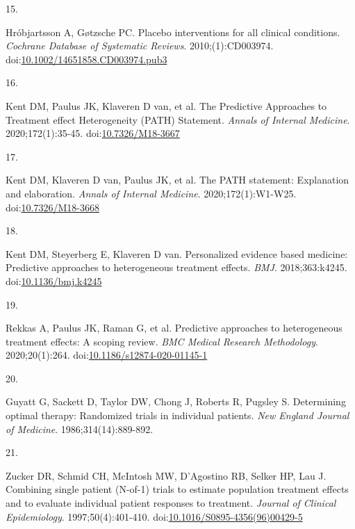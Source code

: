 \documentclass[
  11pt,
]{article}
\newlength{\cslhangindent}
\newlength{\csllabelwidth}
\newenvironment{CSLReferences}[2] %
 {\begin{list}{}{%
  \setlength{\itemindent}{0pt}
  \setlength{\leftmargin}{0pt}
  \setlength{\parsep}{0pt}
  \ifodd #1
   \setlength{\leftmargin}{\cslhangindent}
   \setlength{\itemindent}{-1\cslhangindent}
  \fi
  \setlength{\itemsep}{#2\baselineskip}}}
 {\end{list}}
\newcommand{\CSLLeftMargin}[1]{\parbox[t]{\csllabelwidth}{\strut#1\strut}}
\newcommand{\CSLRightInline}[1]{\parbox[t]{\linewidth - \csllabelwidth}{\strut#1\strut}}
\begin{document}
\begin{CSLReferences}{0}{1}
\CSLLeftMargin{15. }%
\CSLRightInline{Hróbjartsson A, Gøtzsche PC. Placebo interventions for all clinical conditions. \emph{Cochrane Database of Systematic Reviews}. 2010;(1):CD003974. doi:\href{https://doi.org/10.1002/14651858.CD003974.pub3}{10.1002/14651858.CD003974.pub3}}

\CSLLeftMargin{16. }%
\CSLRightInline{{Kent DM, Paulus JK, Klaveren D van, et al.} The {P}redictive {A}pproaches to {T}reatment effect {H}eterogeneity ({PATH}) {S}tatement. \emph{Annals of Internal Medicine}. 2020;172(1):35-45. doi:\href{https://doi.org/10.7326/M18-3667}{10.7326/M18-3667}}

\CSLLeftMargin{17. }%
\CSLRightInline{{Kent DM, Klaveren D van, Paulus JK, et al.} The {PATH} statement: Explanation and elaboration. \emph{Annals of Internal Medicine}. 2020;172(1):W1-W25. doi:\href{https://doi.org/10.7326/M18-3668}{10.7326/M18-3668}}

\CSLLeftMargin{18. }%
\CSLRightInline{Kent DM, Steyerberg E, Klaveren D van. Personalized evidence based medicine: Predictive approaches to heterogeneous treatment effects. \emph{BMJ}. 2018;363:k4245. doi:\href{https://doi.org/10.1136/bmj.k4245}{10.1136/bmj.k4245}}

\CSLLeftMargin{19. }%
\CSLRightInline{{Rekkas A, Paulus JK, Raman G, et al.} Predictive approaches to heterogeneous treatment effects: A scoping review. \emph{BMC Medical Research Methodology}. 2020;20(1):264. doi:\href{https://doi.org/10.1186/s12874-020-01145-1}{10.1186/s12874-020-01145-1}}

\CSLLeftMargin{20. }%
\CSLRightInline{Guyatt G, Sackett D, Taylor DW, Chong J, Roberts R, Pugsley S. Determining optimal therapy: Randomized trials in individual patients. \emph{New England Journal of Medicine}. 1986;314(14):889-892.}

\CSLLeftMargin{21. }%
\CSLRightInline{Zucker DR, Schmid CH, McIntosh MW, D'Agostino RB, Selker HP, Lau J. Combining single patient ({N}-of-1) trials to estimate population treatment effects and to evaluate individual patient responses to treatment. \emph{Journal of Clinical Epidemiology}. 1997;50(4):401-410. doi:\href{https://doi.org/10.1016/S0895-4356(96)00429-5}{10.1016/S0895-4356(96)00429-5}}


\end{CSLReferences}
\end{document}
